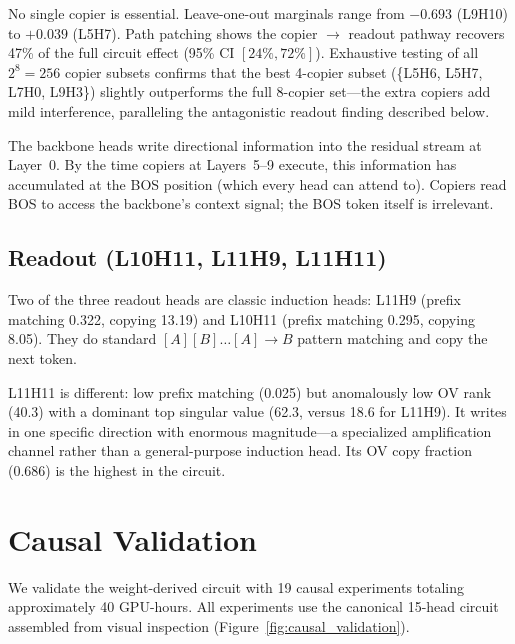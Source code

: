 \documentclass{article}
\begin{document}
No single copier is essential. Leave-one-out marginals range from
$-0.693$ (L9H10) to $+0.039$ (L5H7). Path patching shows the
copier $\to$ readout pathway recovers 47\% of the full circuit effect
(95\% CI $[24\%, 72\%]$). Exhaustive testing of
all $2^8 = 256$ copier subsets confirms that the best 4-copier subset
(\{L5H6, L5H7, L7H0, L9H3\}) slightly outperforms the full 8-copier
set---the extra copiers add mild interference, paralleling the
antagonistic readout finding described below.

The backbone heads write directional information into the residual
stream at Layer~0. By the time copiers at Layers~5--9 execute, this
information has accumulated at the BOS position (which every head can
attend to). Copiers read BOS to access the backbone's context signal;
the BOS token itself is irrelevant.

\subsection{Readout (L10H11, L11H9, L11H11)}

Two of the three readout heads are classic induction heads: L11H9
(prefix matching 0.322, copying 13.19) and L10H11 (prefix matching
0.295, copying 8.05). They do standard $[A][B] \ldots [A] \to B$
pattern matching and copy the next token.

L11H11 is different: low prefix matching (0.025) but anomalously low OV
rank (40.3) with a dominant top singular value (62.3, versus 18.6 for
L11H9). It writes in one specific direction with enormous magnitude---a
specialized amplification channel rather than a general-purpose induction
head. Its OV copy fraction (0.686) is the highest in the circuit.


\section{Causal Validation}
\label{sec:validation}

We validate the weight-derived circuit with 19 causal experiments
totaling approximately 40 GPU-hours. All experiments use the canonical
15-head circuit assembled from visual inspection
(Figure~\ref{fig:causal_validation}).
\end{document}
